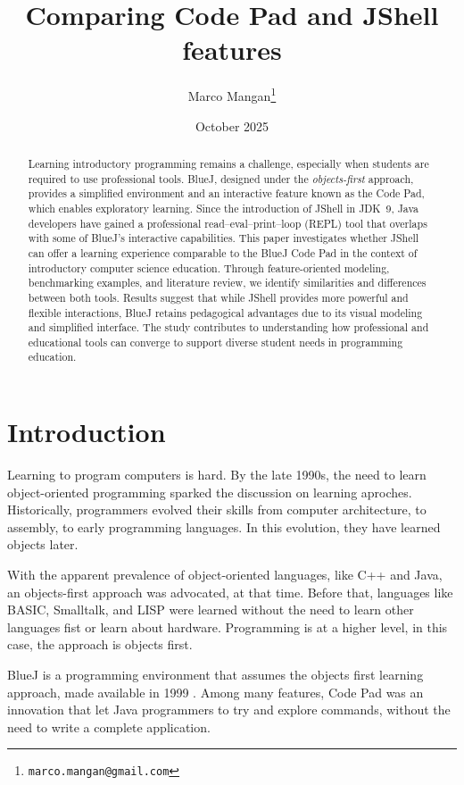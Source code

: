 \documentclass{article}
\title{Comparing Code Pad and JShell features}
\author{Marco Mangan\thanks{\texttt{marco.mangan@gmail.com}}}
\date{October 2025}
\begin{document}
\maketitle

\begin{abstract}
Learning introductory programming remains a challenge, especially when students are required to use professional tools. 
BlueJ, designed under the \textit{objects-first} approach, provides a simplified environment and an interactive feature known as the Code Pad, which enables exploratory learning. 
Since the introduction of JShell in JDK~9, Java developers have gained a professional read--eval--print--loop (REPL) tool that overlaps with some of BlueJ's interactive capabilities. 
This paper investigates whether JShell can offer a learning experience comparable to the BlueJ Code Pad in the context of introductory computer science education. 
Through feature-oriented modeling, benchmarking examples, and literature review, we identify similarities and differences between both tools. 
Results suggest that while JShell provides more powerful and flexible interactions, BlueJ retains pedagogical advantages due to its visual modeling and simplified interface. 
The study contributes to understanding how professional and educational tools can converge to support diverse student needs in programming education.
\end{abstract}

\section{Introduction}

Learning to program computers is hard. By the late 1990s, the need to learn object-oriented programming sparked the discussion on learning aproches. Historically, programmers evolved their skills from computer architecture, to assembly, to early programming languages. In this evolution, they have learned objects later.

With the apparent prevalence of object-oriented languages, like C++ and Java, an objects-first approach was advocated, at that time. Before that, languages like BASIC, Smalltalk, and LISP were learned without the need to learn other languages fist or learn about hardware. Programming is at a higher level, in this case, the approach is objects first.

BlueJ is a programming environment that assumes the objects first learning approach, made available in 1999 \cite{barnes2008objects}\cite{bluej_paper}. Among many features, Code Pad was an innovation that let Java programmers to try and explore commands, without the need to write a complete application.
\end{document}

